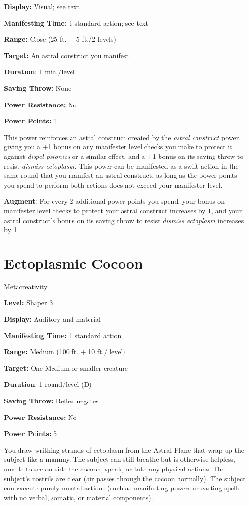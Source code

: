 \documentclass{article}
\begin{document}
\textbf{Display:} Visual; see text

\textbf{Manifesting Time:} 1 standard action; see text

\textbf{Range:} Close (25 ft. + 5 ft./2 levels)

\textbf{Target:} An astral construct you manifest

\textbf{Duration:} 1 min./level

\textbf{Saving Throw:} None

\textbf{Power Resistance:} No

\textbf{Power Points:} 1

This power reinforces an astral construct created by the \textit{astral construct 
}power, giving you a +1 bonus on any manifester level checks you make to protect 
it against \textit{dispel psionics }or a similar effect, and a +1 bonus on its 
saving throw to resist \textit{dismiss ectoplasm. }This power can be manifested 
as a swift action in the same round that you manifest an astral construct, as long 
as the power points you spend to perform both actions does not exceed your manifester 
level.

\textbf{Augment:} For every 2 additional power points you spend, your bonus on 
manifester level checks to protect your astral construct increases by 1, and your 
astral construct's bonus on its saving throw to resist \textit{dismiss ectoplasm 
}increases by 1.

\vspace{12pt}
\section*{Ectoplasmic Cocoon}

Metacreativity

\textbf{Level:} Shaper 3

\textbf{Display:} Auditory and material

\textbf{Manifesting Time:} 1 standard action

\textbf{Range:} Medium (100 ft. + 10 ft./ level)

\textbf{Target:} One Medium or smaller creature

\textbf{Duration:} 1 round/level (D)

\textbf{Saving Throw:} Reflex negates

\textbf{Power Resistance:} No

\textbf{Power Points:} 5

You draw writhing strands of ectoplasm from the Astral Plane that wrap up the subject 
like a mummy. The subject can still breathe but is otherwise helpless, unable to 
see outside the cocoon, speak, or take any physical actions. The subject's nostrils 
are clear (air passes through the cocoon normally). The subject can execute purely 
mental actions (such as manifesting powers or casting spells with no verbal, somatic, 
or material components).
\end{document}
